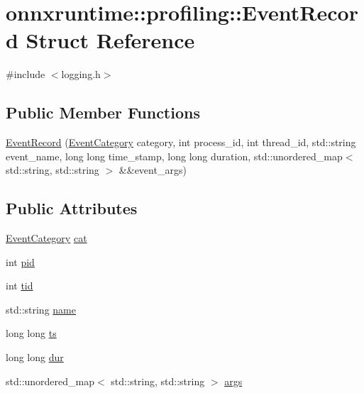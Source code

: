 \hypertarget{structonnxruntime_1_1profiling_1_1EventRecord}{}\section{onnxruntime\+:\+:profiling\+:\+:Event\+Record Struct Reference}
\label{structonnxruntime_1_1profiling_1_1EventRecord}


{\ttfamily \#include $<$logging.\+h$>$}

\subsection*{Public Member Functions}
\begin{DoxyCompactItemize}
\item 
\mbox{\hyperlink{structonnxruntime_1_1profiling_1_1EventRecord_ab786e03ad54faa8f95d37e9e1ee481ca}{Event\+Record}} (\mbox{\hyperlink{namespaceonnxruntime_1_1profiling_acbb1d7474c26b32c5bfef2ce1ab63734}{Event\+Category}} category, int process\+\_\+id, int thread\+\_\+id, std\+::string event\+\_\+name, long long time\+\_\+stamp, long long duration, std\+::unordered\+\_\+map$<$ std\+::string, std\+::string $>$ \&\&event\+\_\+args)
\end{DoxyCompactItemize}
\subsection*{Public Attributes}
\begin{DoxyCompactItemize}
\item 
\mbox{\hyperlink{namespaceonnxruntime_1_1profiling_acbb1d7474c26b32c5bfef2ce1ab63734}{Event\+Category}} \mbox{\hyperlink{structonnxruntime_1_1profiling_1_1EventRecord_a4011d12ea3197585caa7a059d8db2dc1}{cat}}
\item 
int \mbox{\hyperlink{structonnxruntime_1_1profiling_1_1EventRecord_a209bd9fc66345301f935e61d113b7fdc}{pid}}
\item 
int \mbox{\hyperlink{structonnxruntime_1_1profiling_1_1EventRecord_af3fa46823d3c6e489af93d8d51827179}{tid}}
\item 
std\+::string \mbox{\hyperlink{structonnxruntime_1_1profiling_1_1EventRecord_ab180ebaf24bd3726e56ef72910073547}{name}}
\item 
long long \mbox{\hyperlink{structonnxruntime_1_1profiling_1_1EventRecord_ad2d926716e9a1132b3539c191aa990d3}{ts}}
\item 
long long \mbox{\hyperlink{structonnxruntime_1_1profiling_1_1EventRecord_aaed3bbfc663c4ea4c0130dd422a871ca}{dur}}
\item 
std\+::unordered\+\_\+map$<$ std\+::string, std\+::string $>$ \mbox{\hyperlink{structonnxruntime_1_1profiling_1_1EventRecord_a975e3dc6c02a05673ac3b770453365dc}{args}}
\end{DoxyCompactItemize}


